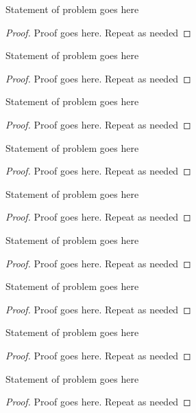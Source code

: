 \documentclass[12pt]{article}
\newenvironment{problem}[2][Problem]{\begin{trivlist}
\item[\hskip \labelsep {\bfseries #1}\hskip \labelsep {\bfseries #2.}]}{\end{trivlist}}
\begin{document}
\begin{problem}{x.yz}
Statement of problem goes here
\end{problem}

\begin{proof}
Proof goes here. Repeat as needed
\end{proof}


\begin{problem}{x.yz}
Statement of problem goes here
\end{problem}

\begin{proof}
Proof goes here. Repeat as needed
\end{proof}


\begin{problem}{x.yz}
Statement of problem goes here
\end{problem}

\begin{proof}
Proof goes here. Repeat as needed
\end{proof}


\begin{problem}{x.yz}
Statement of problem goes here
\end{problem}

\begin{proof}
Proof goes here. Repeat as needed
\end{proof}


\begin{problem}{x.yz}
Statement of problem goes here
\end{problem}

\begin{proof}
Proof goes here. Repeat as needed
\end{proof}


\begin{problem}{x.yz}
Statement of problem goes here
\end{problem}

\begin{proof}
Proof goes here. Repeat as needed
\end{proof}


\begin{problem}{x.yz}
Statement of problem goes here
\end{problem}

\begin{proof}
Proof goes here. Repeat as needed
\end{proof}


\begin{problem}{x.yz}
Statement of problem goes here
\end{problem}

\begin{proof}
Proof goes here. Repeat as needed
\end{proof}


\begin{problem}{x.yz}
Statement of problem goes here
\end{problem}

\begin{proof}
Proof goes here. Repeat as needed
\end{proof}
\end{document}

